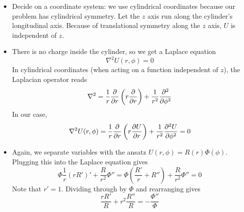 \documentclass[11pt, a4paper]{article}
\renewcommand{\laplacian}{\nabla^{2}}
\begin{document}
\begin{itemize}
	\item Decide on a coordinate system: we use cylindrical coordinates because our problem has cylindrical symmetry. Let the $ z $ axis run along the cylinder's longitudinal axis. Because of translational symmetry along the $ z $ axis, $ U $ is independent of $ z $. 
	
	\item There is no charge inside the cylinder, so we get a Laplace equation
	\begin{equation*}
		\laplacian U(r, \phi) = 0
	\end{equation*}
	In cylindrical coordinates (when acting on a function independent of $ z $), the Laplacian operator reads
	\begin{equation*}
		\laplacian = \frac{1}{r}\pdv{r}\left(r \pdv{r}\right) + \frac{1}{r^{2}} \pdv[2]{}{\phi}
	\end{equation*}
	In our case,
	\begin{equation*}
		\laplacian U(r, \phi) = \frac{1}{r}\pdv{r}\left(r \pdv{U}{r}\right) + \frac{1}{r^{2}} \pdv[2]{U}{\phi} = 0
	\end{equation*}
	
	\item Again, we separate variables with the ansatz $ U(r, \phi) = R(r)\Phi(\phi) $. Plugging this into the Laplace equation gives
	\begin{equation*}
		\Phi \frac{1}{r}(rR')' + \frac{R}{r^{2}}\Phi'' = \Phi \left(\frac{R'}{r} + R''\right) + \frac{R}{r^{2}}\Phi'' = 0
	\end{equation*}
	Note that $ r'  = 1 $. Dividing through by $ \Phi $ and rearranging gives
	\begin{equation*}
		\frac{rR'}{R} + r^{2}\frac{R''}{R} = - \frac{\Phi''}{\Phi}
	\end{equation*}
	

\end{itemize}
\end{document}
